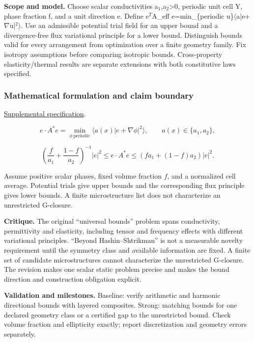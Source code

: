 \documentclass[
  11pt,
]{article}
\begin{document}
\textbf{Scope and model.} Choose scalar conductivities
a\ensuremath{{}_{1}},a\ensuremath{{}_{2}}>0, periodic unit cell Y, phase
fraction f, and a unit direction e. Define e\ensuremath{{}^{T}}A\_eff
e=min\_\{periodic
u\}\ensuremath{\langle}a|e+\ensuremath{\nabla}u|\ensuremath{{}^{2}}\ensuremath{\rangle}.
Use an admissible potential trial field for an upper bound and a
divergence-free flux variational principle for a lower bound.
Distinguish bounds valid for every arrangement from optimization over a
finite geometry family. Fix isotropy assumptions before comparing
isotropic bounds. Cross-property elasticity/thermal results are separate
extensions with both constitutive laws specified.

\subsubsection{Mathematical formulation and claim boundary}

\href{https://github.com/rick-stevens-ai/Pure-Thought/blob/main/supplemental/S03.md}{Supplemental
specification}.

\[e\cdot A^*e=\min_{\phi\ \mathrm{periodic}}
\langle a(x)|e+\nabla\phi|^2\rangle,\qquad a(x)\in\{a_1,a_2\},\]

\[\left(\frac f{a_1}+\frac{1-f}{a_2}\right)^{-1}|e|^2
\le e\cdot A^*e\le(fa_1+(1-f)a_2)|e|^2.\]

Assume positive scalar phases, fixed volume fraction \(f\), and a
normalized cell average. Potential trials give upper bounds and the
corresponding flux principle gives lower bounds. A finite microstructure
list does not characterize an unrestricted G-closure.

\textbf{Critique.} The original ``universal bounds'' problem spans
conductivity, permittivity and elasticity, including tensor and
frequency effects with different variational principles. ``Beyond
Hashin--Shtrikman'' is not a measurable novelty requirement until the
symmetry class and available information are fixed. A finite set of
candidate microstructures cannot characterize the unrestricted
G-closure. The revision makes one scalar static problem precise and
makes the bound direction and construction obligation explicit.

\textbf{Validation and milestones.} Baseline: verify arithmetic and
harmonic directional bounds with layered composites. Strong: matching
bounds for one declared geometry class or a certified gap to the
unrestricted bound. Check volume fraction and ellipticity exactly;
report discretization and geometry errors separately.
\end{document}
